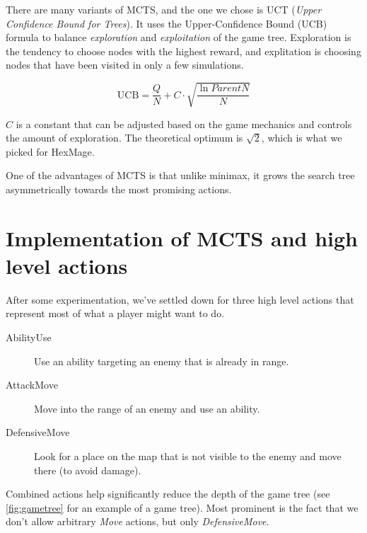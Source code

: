 There are many variants of MCTS, and the one we chose is UCT (\emph{Upper Confidence Bound for Trees}). It uses the Upper-Confidence Bound (UCB) formula to balance \emph{exploration} and \emph{exploitation} of the game tree. Exploration is the tendency
to choose nodes with the highest reward, and explitation is choosing nodes that have been visited in only a few simulations.

\begin{equation}
	\text{UCB} = \frac{Q}{N} + C \cdot \sqrt{\frac{\ln ParentN}{N}}	
\end{equation}

$C$ is a constant that can be adjusted based on the game mechanics and controls the amount of exploration. The theoretical optimum
is $\sqrt{2}$, which is what we picked for HexMage.

One of the advantages of MCTS is that unlike minimax, it grows the search tree asymmetrically towards
the most promising actions.

\section{Implementation of MCTS and high level actions}

After some experimentation, we've settled down for three high level actions
that represent most of what a player might want to do.

\begin{description}
\item [AbilityUse] Use an ability targeting an enemy that is already in range.
\item [AttackMove] Move into the range of an enemy and use an ability.
\item [DefensiveMove] Look for a place on the map that is not visible to the enemy and move there (to avoid damage).
\end{description}

Combined actions help significantly reduce the depth of the game tree (see \autoref{fig:gametree} for an example of a game tree). Most
prominent is the fact that we don't allow arbitrary \emph{Move} actions, but
only \emph{DefensiveMove}.

